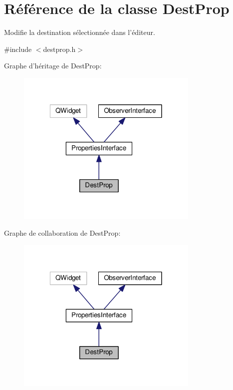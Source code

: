 \hypertarget{classDestProp}{\section{Référence de la classe Dest\+Prop}
\label{classDestProp}
}


Modifie la destination sélectionnée dans l’éditeur.  




{\ttfamily \#include $<$destprop.\+h$>$}



Graphe d'héritage de Dest\+Prop\+:\nopagebreak
\begin{figure}[H]
\begin{center}
\leavevmode
\includegraphics[width=247pt]{d4/d2d/classDestProp__inherit__graph}
\end{center}
\end{figure}


Graphe de collaboration de Dest\+Prop\+:\nopagebreak
\begin{figure}[H]
\begin{center}
\leavevmode
\includegraphics[width=247pt]{d4/d2b/classDestProp__coll__graph}
\end{center}
\end{figure}
